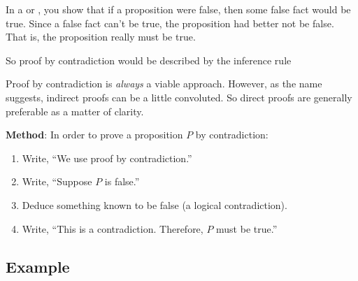 \begin{problems}
\classproblems
{}
\homeworkproblems
{}
\end{problems}


In a  or , you show that
if a proposition were false, then some false fact would be true.  Since a
false fact can't be true, the proposition had better not be false.  That
is, the proposition really must be true. 

\begin{editingnotes}

So proof by
contradiction would be described by the inference rule
\begin{rul*}
\end{rul*}

\end{editingnotes}

Proof by contradiction is \emph{always} a viable approach.  However, as
the name suggests, indirect proofs can be a little convoluted.  So direct
proofs are generally preferable as a matter of clarity.

\textbf{Method}: In order to prove a proposition $P$ by contradiction:

\begin{enumerate}

\item Write, ``We use proof by contradiction.''

\item Write, ``Suppose $P$ is false.''

\item Deduce something known to be false (a logical contradiction).

\item Write, ``This is a contradiction.  Therefore, $P$ must be
true.''

\end{enumerate}

\subsection*{Example}

